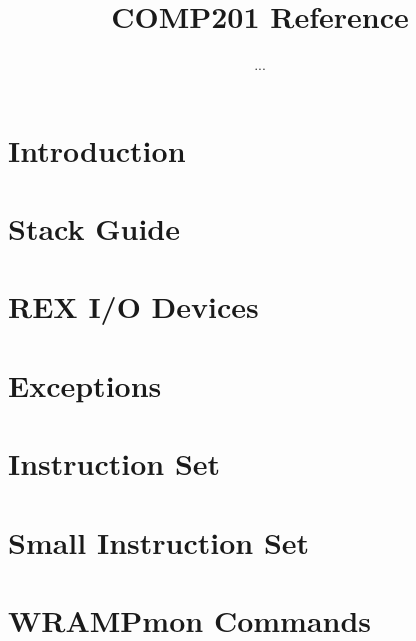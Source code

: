 \documentclass[a4paper]{book}
\title{COMP201 Reference}
\author{...}
\begin{document}
\maketitle
\tableofcontents




\chapter{Introduction}
\label{chapter:intro}

\chapter{Stack Guide}
\label{chapter:stack}

\chapter{REX I/O Devices}
\label{chapter:io}

\chapter{Exceptions}
\label{chapter:exceptions}

\appendix
\chapter{Instruction Set}
\label{appendix:instr}
%

\chapter{Small Instruction Set}


\chapter{WRAMPmon Commands}
\label{appendix:wrampmon}

\end{document}
